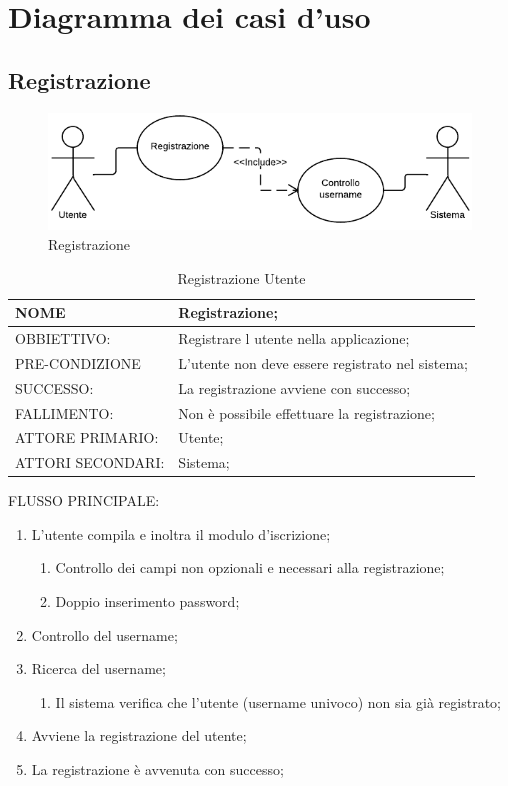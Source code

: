 \chapter{Diagramma dei casi d'uso}

\section{Registrazione}
\begin{figure}[h!]
\centering
\includegraphics[scale=0.60]{img/use/Reg.png}
\caption{Registrazione}
\label{fig:registrazione}
\end{figure}
\begin{table}[H]
\begin{tabular}{p{}|p{}}
\toprule
NOME & Registrazione;\\
\hline
OBBIETTIVO: & Registrare l utente nella applicazione;\\
\hline
PRE-CONDIZIONE & L'utente non deve essere registrato nel sistema;\\
\hline
SUCCESSO: & La registrazione avviene con successo;\\
\hline
FALLIMENTO: & Non è possibile effettuare la registrazione; \\
\hline
ATTORE PRIMARIO: & Utente;\\
\hline
ATTORI SECONDARI: & Sistema;\\
\bottomrule
\end{tabular}
\caption{Registrazione Utente}
\label{table:reg}
\end{table}
FLUSSO PRINCIPALE:
\begin{enumerate}
\item L'utente compila e inoltra il modulo d'iscrizione;
\begin{enumerate}
\item Controllo dei campi non opzionali e necessari alla registrazione;
\item Doppio inserimento password;
\end{enumerate}
\item Controllo del username;
\item Ricerca del username;
\begin{enumerate}
\item Il sistema verifica che l'utente (username univoco) non sia già registrato;
\end{enumerate}
\item Avviene la registrazione del utente;
\item La registrazione è avvenuta con successo;
\end{enumerate}

